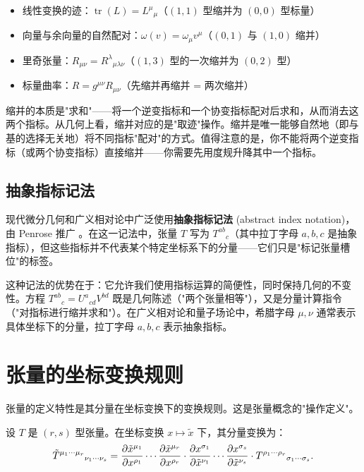 \begin{itemize}
    \item 线性变换的迹：$\operatorname{tr}(L) = L^\mu{}_\mu$（$(1,1)$ 型缩并为 $(0,0)$ 型标量）
    \item 向量与余向量的自然配对：$\omega(v) = \omega_\mu v^\mu$（$(0,1)$ 与 $(1,0)$ 缩并）
    \item 里奇张量：$R_{\mu\nu} = R^\lambda{}_{\mu\lambda\nu}$（$(1,3)$ 型的一次缩并为 $(0,2)$ 型）
    \item 标量曲率：$R = g^{\mu\nu} R_{\mu\nu}$（先缩并再缩并 = 两次缩并）
\end{itemize}

\begin{remark}
缩并的本质是"求和"——将一个逆变指标和一个协变指标配对后求和，从而消去这两个指标。从几何上看，缩并对应的是"取迹"操作。缩并是唯一能够自然地（即与基的选择无关地）将不同指标"配对"的方式。值得注意的是，你不能将两个逆变指标（或两个协变指标）直接缩并——你需要先用度规升降其中一个指标。
\end{remark}

\subsection{抽象指标记法}

现代微分几何和广义相对论中广泛使用\textbf{抽象指标记法} (abstract index notation)，由 Penrose 推广 \cite{Reall_Part3_GR}。在这一记法中，张量 $T$ 写为 $T^{ab}{}_{c}$（其中拉丁字母 $a,b,c$ 是抽象指标），但这些指标并不代表某个特定坐标系下的分量——它们只是"标记张量槽位"的标签。

这种记法的优势在于：它允许我们使用指标运算的简便性，同时保持几何的不变性。方程 $T^{ab}{}_{c} = U^{a}{}_{cd} V^{bd}$ 既是几何陈述（"两个张量相等"），又是分量计算指令（"对指标进行缩并求和"）。在广义相对论和量子场论中，希腊字母 $\mu,\nu$ 通常表示具体坐标下的分量，拉丁字母 $a,b,c$ 表示抽象指标。

\section{张量的坐标变换规则}

张量的定义特性是其分量在坐标变换下的变换规则。这是张量概念的"操作定义"。

\begin{property}[张量变换律]
设 $T$ 是 $(r,s)$ 型张量。在坐标变换 $x \mapsto \tilde{x}$ 下，其分量变换为：
\begin{equation}
    \tilde{T}^{\mu_1\cdots\mu_r}{}_{\nu_1\cdots\nu_s}
    = \frac{\partial \tilde{x}^{\mu_1}}{\partial x^{\rho_1}} \cdots \frac{\partial \tilde{x}^{\mu_r}}{\partial x^{\rho_r}}
    \cdot \frac{\partial x^{\sigma_1}}{\partial \tilde{x}^{\nu_1}} \cdots \frac{\partial x^{\sigma_s}}{\partial \tilde{x}^{\nu_s}}
    \cdot T^{\rho_1\cdots\rho_r}{}_{\sigma_1\cdots\sigma_s}.
\end{equation}
\end{property}

